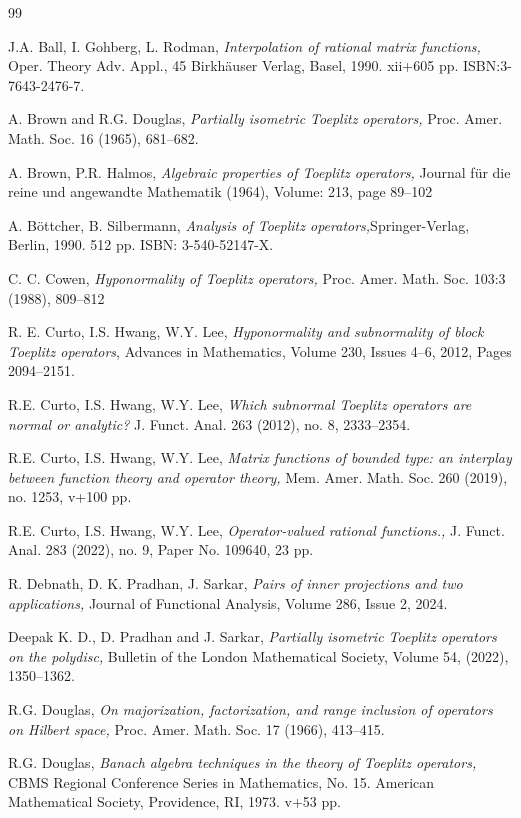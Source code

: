 \documentclass[12pt]{amsart}
\theoremstyle{definition}
\newcommand{\1}{{\mbox{\bf 1}}}
\begin{document}
\begin{thebibliography}{99}

J.A. Ball, I. Gohberg, L. Rodman, 
\emph{Interpolation of rational matrix functions,}
Oper. Theory Adv. Appl., 45
Birkhäuser Verlag, Basel, 1990. xii+605 pp.
ISBN:3-7643-2476-7.

A.  Brown and R.G. Douglas,  
\emph{Partially isometric Toeplitz operators,} Proc. Amer. Math. Soc. 16 (1965), 681--682. 

A. Brown, P.R. Halmos, 
\emph{Algebraic properties of Toeplitz operators,}
Journal für die reine und angewandte Mathematik (1964), Volume: 213, page 89--102

A. B\"ottcher, B. Silbermann, 
\emph{Analysis of Toeplitz operators,}Springer-Verlag, Berlin, 1990. 512 pp. ISBN: 3-540-52147-X.

C. C. Cowen, 
\emph{Hyponormality of Toeplitz operators,} Proc. Amer. Math. Soc. 103:3
(1988), 809–812

R. E. Curto, I.S. Hwang, W.Y. Lee,
\emph{Hyponormality and subnormality of block Toeplitz operators},
Advances in Mathematics, Volume 230, Issues 4--6, 2012, Pages 2094--2151.

R.E. Curto, I.S. Hwang, W.Y. Lee,
\emph{Which subnormal Toeplitz operators are normal or analytic?} J. Funct. Anal. 263 (2012), no. 8, 2333--2354. 

R.E. Curto, I.S. Hwang, W.Y. Lee,
\emph{Matrix functions of bounded type: an interplay between function theory and operator theory,} Mem. Amer. Math. Soc. 260 (2019), no. 1253, v+100 pp.

R.E. Curto, I.S. Hwang, W.Y. Lee, \emph{Operator-valued rational functions.,} J. Funct. Anal. 283 (2022), no. 9, Paper No. 109640, 23 pp.

R. Debnath, D. K. Pradhan, J. Sarkar,
\emph{Pairs of inner projections and two applications,} Journal of Functional Analysis,
Volume 286, Issue 2, 2024.

Deepak K. D., D. Pradhan and J. Sarkar, 
\emph{Partially isometric Toeplitz operators on the polydisc,} Bulletin of the London Mathematical Society, Volume 54, (2022), 1350--1362.

R.G. Douglas, 
\emph{On majorization, factorization, and range inclusion of operators on Hilbert space,}
Proc. Amer. Math. Soc. 17 (1966), 413--415. 

R.G. Douglas, 
\emph{ Banach algebra techniques in the theory of Toeplitz operators,}  CBMS Regional Conference Series in Mathematics, No. 15. American Mathematical Society, Providence, RI, 1973. v+53 pp. 


\end{thebibliography}
\end{document}
